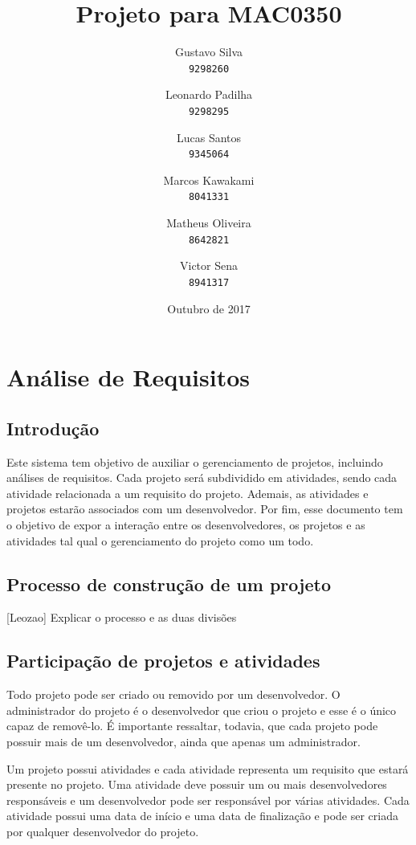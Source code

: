 \documentclass{article}
\title{Projeto para MAC0350}
\author{
	Gustavo Silva\\
	\texttt{9298260}
	\and
	Leonardo Padilha\\
	\texttt{9298295}
	\and
	Lucas Santos\\
	\texttt{9345064}
	\and
	Marcos Kawakami\\
	\texttt{8041331}
	\and
	Matheus Oliveira\\
	\texttt{8642821}
	\and
	Victor Sena\\
	\texttt{8941317}
}
\date{Outubro de 2017}
\begin{document}
\maketitle

\newpage

\tableofcontents

\newpage

\section{Análise de Requisitos}

	\subsection{Introdução}
	Este sistema tem objetivo de auxiliar o gerenciamento de projetos, incluindo análises de requisitos. Cada projeto será subdividido em atividades, sendo cada atividade relacionada a um requisito do projeto. Ademais, as atividades e projetos estarão associados com um desenvolvedor. Por fim, esse documento tem o objetivo de expor a interação entre os desenvolvedores, os projetos e as atividades tal qual o gerenciamento do projeto como um todo.

	\subsection{Processo de construção de um projeto}
	[Leozao] Explicar o processo e as duas divisões

	\subsection{Participação de projetos e atividades}
	Todo projeto pode ser criado ou removido por um desenvolvedor. O administrador do projeto é o desenvolvedor que criou o projeto e esse é o único capaz de removê-lo. É importante ressaltar, todavia, que cada projeto pode possuir mais de um desenvolvedor, ainda que apenas um administrador.

	Um projeto possui atividades e cada atividade representa um requisito que estará presente no projeto. Uma atividade deve possuir um ou mais desenvolvedores responsáveis e um desenvolvedor pode ser responsável por várias atividades. Cada atividade possui uma data de início e uma data de finalização e pode ser criada por qualquer desenvolvedor do projeto.
\end{document}
